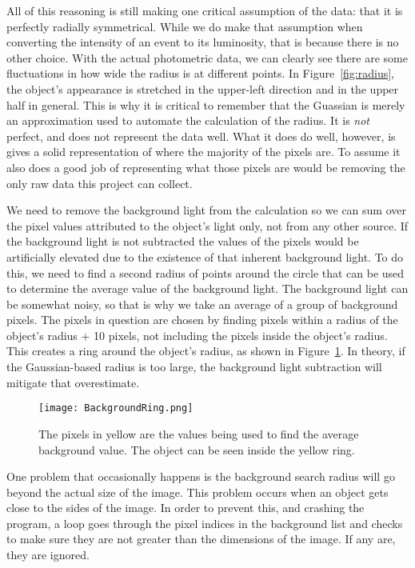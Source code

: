 All of this reasoning is still making one critical assumption of the data: that it is perfectly radially symmetrical. While we do make that assumption when converting the intensity of an event to its luminosity, that is because there is no other choice. With the actual photometric data, we can clearly see there are some fluctuations in how wide the radius is at different points. In Figure~\ref{fig:radius}, the object's appearance is stretched in the upper-left direction and in the upper half in general. This is why it is critical to remember that the Guassian is merely an approximation used to automate the calculation of the radius. It is \textit{not} perfect, and does not represent the data well. What it does do well, however, is gives a solid representation of where the majority of the pixels are. To assume it also does a good job of representing what those pixels are would be removing the only raw data this project can collect.

We need to remove the background light from the calculation so we can sum over the pixel values attributed to the object's light only, not from any other source. If the background light is not subtracted the values of the pixels would be artificially elevated due to the existence of that inherent background light. To do this, we need to find a second radius of points around the circle that can be used to determine the average value of the background light. The background light can be somewhat noisy, so that is why we take an average of a group of background pixels. The pixels in question are chosen by finding pixels within a radius of the object's radius + 10 pixels, not including the pixels inside the object's radius. This creates a ring around the object's radius, as shown in Figure~\ref{fig:background}. In theory, if the Gaussian-based radius is too large, the background light subtraction will mitigate that overestimate.

\begin{figure}[ht!]
	\centering
	\texttt{[image: BackgroundRing.png]}
	\caption{The pixels in yellow are the values being used to find the average background value. The object can be seen inside the yellow ring.}
	\label{fig:background}
\end{figure}

One problem that occasionally happens is the background search radius will go beyond the actual size of the image. This problem occurs when an object gets close to the sides of the image. In order to prevent this, and crashing the program, a loop goes through the pixel indices in the background list and checks to make sure they are not greater than the dimensions of the image. If any are, they are ignored. 


